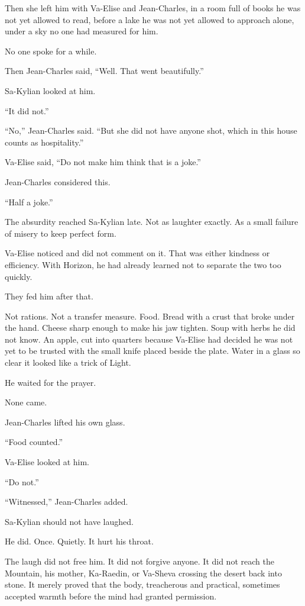 Then she left him with Va-Elise and Jean-Charles, in a room full of books he was not yet allowed to read, before a lake he was not yet allowed to approach alone, under a sky no one had measured for him.\par
No one spoke for a while.\par
Then Jean-Charles said, “Well. That went beautifully.”\par
Sa-Kylian looked at him.\par
“It did not.”\par
“No,” Jean-Charles said. “But she did not have anyone shot, which in this house counts as hospitality.”\par
Va-Elise said, “Do not make him think that is a joke.”\par
Jean-Charles considered this.\par
“Half a joke.”\par
The absurdity reached Sa-Kylian late. Not as laughter exactly. As a small failure of misery to keep perfect form.\par
Va-Elise noticed and did not comment on it. That was either kindness or efficiency. With Horizon, he had already learned not to separate the two too quickly.\par
They fed him after that.\par
Not rations. Not a transfer measure. Food. Bread with a crust that broke under the hand. Cheese sharp enough to make his jaw tighten. Soup with herbs he did not know. An apple, cut into quarters because Va-Elise had decided he was not yet to be trusted with the small knife placed beside the plate. Water in a glass so clear it looked like a trick of Light.\par
He waited for the prayer.\par
None came.\par
Jean-Charles lifted his own glass.\par
“Food counted.”\par
Va-Elise looked at him.\par
“Do not.”\par
“Witnessed,” Jean-Charles added.\par
Sa-Kylian should not have laughed.\par
He did. Once. Quietly. It hurt his throat.\par
The laugh did not free him. It did not forgive anyone. It did not reach the Mountain, his mother, Ka-Raedin, or Va-Sheva crossing the desert back into stone. It merely proved that the body, treacherous and practical, sometimes accepted warmth before the mind had granted permission.\par
